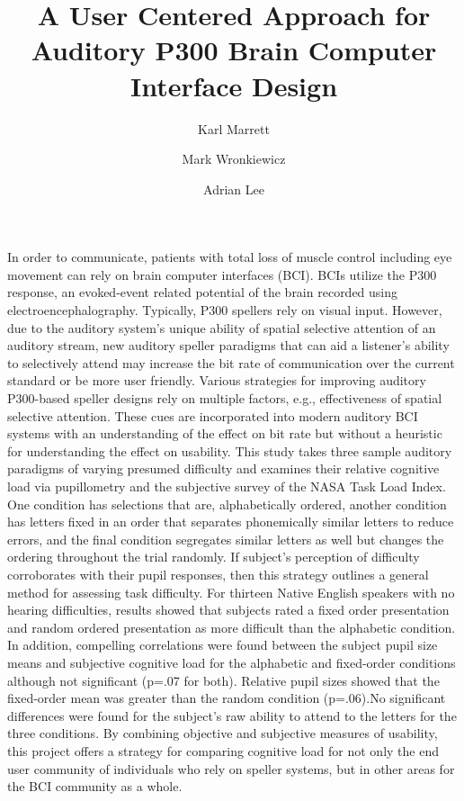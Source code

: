 \documentclass[12pt]{article}
\title{\LARGE A User Centered Approach for Auditory P300 Brain Computer Interface Design}
\author[1]{\footnotesize Karl Marrett}
\author[2]{\footnotesize Mark Wronkiewicz}
\author[3]{\footnotesize Adrian Lee}
\affil[1]{\scriptsize Department of Neurobiology, University of Washington}
\affil[2]{\scriptsize Department of Neurobiology and Behavior, University of Washington}
\affil[3]{\scriptsize Department of Speech and Hearing Science, University of Washington}
\date{}
\begin{document}
\begin{Abstract}

In order to communicate, patients with total loss of muscle control
including eye movement can rely on brain computer interfaces (BCI).
BCIs utilize the P300 response, an evoked-event related potential of
the brain recorded using electroencephalography. Typically, P300 spellers rely on
visual input.  However, due to the auditory system's unique ability
of spatial selective attention of an auditory stream, new auditory
speller paradigms that can aid a listener's ability to selectively
attend may increase the bit rate of communication over the current
standard or be more user friendly.  Various strategies for improving
auditory P300-based speller designs rely on multiple factors, e.g.,
effectiveness of spatial selective attention. These cues are
incorporated into modern auditory BCI systems with an understanding
of the effect on bit rate but without a heuristic for understanding
the effect on usability. This study takes three sample auditory
paradigms of varying presumed difficulty and examines their relative
cognitive load via pupillometry and the subjective survey of the
NASA Task Load Index. One condition has selections that are,
alphabetically ordered, another condition has letters fixed in an
order that separates phonemically similar letters to reduce errors,
and the final condition segregates similar letters as well but
changes the ordering throughout the trial randomly.  If subject's
perception of difficulty corroborates with their pupil responses,
then this strategy outlines a general method for assessing task
difficulty.  For thirteen Native English speakers
with no hearing difficulties, results showed that subjects rated a fixed
order presentation and random ordered presentation as more difficult
than the alphabetic condition.  In addition, compelling correlations
were found between the subject pupil size means and subjective
cognitive load for the alphabetic and fixed-order conditions
although not significant (p=.07 for both).  Relative pupil sizes
showed that the fixed-order mean was greater than the random
condition (p=.06).No significant differences were found for the
subject's raw ability to attend to the letters for the three
conditions. By combining objective and subjective measures of
usability, this project offers a strategy for comparing cognitive
load for not only the end user community of individuals who rely on
speller systems, but in other areas for the BCI community as a
whole.

\end{Abstract}
\end{document}
